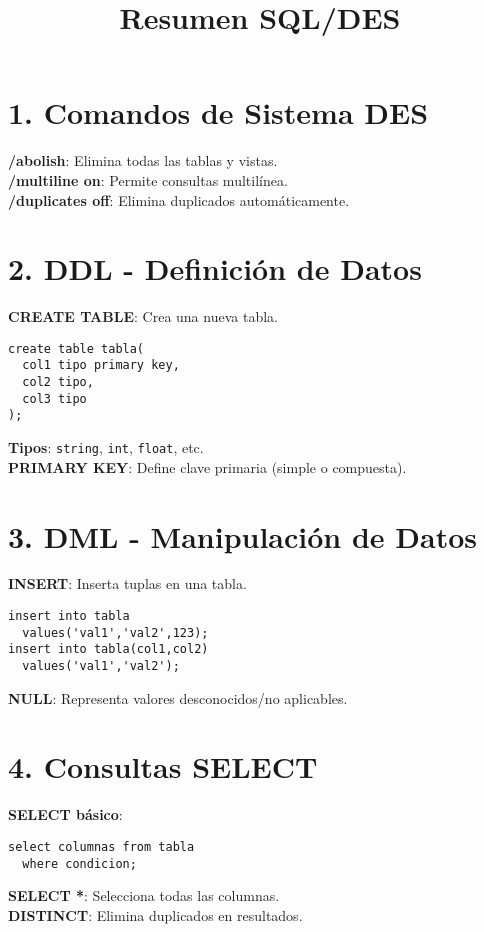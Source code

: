 \documentclass[10pt,a4paper,twocolumn]{article}
\title{\textbf{Resumen SQL/DES}}
\author{}
\date{}
\begin{document}
\maketitle

\section*{1. Comandos de Sistema DES}

\textbf{/abolish}: Elimina todas las tablas y vistas.\\
\textbf{/multiline on}: Permite consultas multilínea.\\
\textbf{/duplicates off}: Elimina duplicados automáticamente.

\section*{2. DDL - Definición de Datos}

\textbf{CREATE TABLE}: Crea una nueva tabla.
\begin{lstlisting}
create table tabla(
  col1 tipo primary key,
  col2 tipo,
  col3 tipo
);
\end{lstlisting}

\textbf{Tipos}: \texttt{string}, \texttt{int}, \texttt{float}, etc.\\
\textbf{PRIMARY KEY}: Define clave primaria (simple o compuesta).

\section*{3. DML - Manipulación de Datos}

\textbf{INSERT}: Inserta tuplas en una tabla.
\begin{lstlisting}
insert into tabla 
  values('val1','val2',123);
insert into tabla(col1,col2) 
  values('val1','val2');
\end{lstlisting}

\textbf{NULL}: Representa valores desconocidos/no aplicables.

\section*{4. Consultas SELECT}

\textbf{SELECT básico}:
\begin{lstlisting}
select columnas from tabla
  where condicion;
\end{lstlisting}

\textbf{SELECT *}: Selecciona todas las columnas.\\
\textbf{DISTINCT}: Elimina duplicados en resultados.
\end{document}
